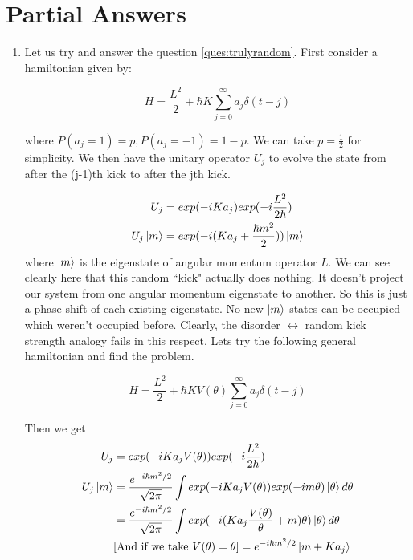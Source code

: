 \documentclass[12pt]{article}
\begin{document}
\section{Partial Answers}
\begin{enumerate}
    \item Let us try and answer the question \ref{ques:trulyrandom}.
    First consider a hamiltonian given by:

    \begin{equation}
        H = \frac{L^2}{2} + \hbar K \sum_{j=0}^{\infty} a_j \delta(t - j)
    \end{equation}

    where $P(a_j = 1) = p, P(a_j = -1) = 1 - p$. We can take $p = \frac{1}{2}$
    for simplicity. We then have the unitary operator $U_j$ to evolve the state
    from after the (j-1)th kick to after the jth kick.

    \begin{align}
        U_j &= exp(-iKa_j) exp(-i\frac{L^2}{2\hbar}) \\
        U_j \ket{m} &= exp(-i (Ka_j + \frac{\hbar m^2}{2})) \ket{m}
    \end{align}
    where $\ket{m}$ is the eigenstate of angular momentum operator $L$.
    We can see clearly here that this random ``kick" actually does nothing.
    It doesn't project our system from one angular momentum eigenstate to
    another. So this is just a phase shift of each existing eigenstate.
    No new $\ket{m}$ states can be occupied which weren't occupied before.
    Clearly, the disorder $\leftrightarrow$ random kick strength analogy
    fails in this respect. Lets try the following general hamiltonian
    and find the problem.

    \begin{equation}
        H = \frac{L^2}{2}
            + \hbar K V(\theta) \sum_{j=0}^{\infty} a_j \delta(t - j)
    \end{equation}

    Then we get
    \begin{align}
        U_j &= exp(-iKa_jV(\theta)) exp(-i\frac{L^2}{2\hbar}) \\
        U_j \ket{m} &= 	\frac{e^{-i \hbar m^2/2}}{\sqrt{2\pi}}
        \int exp(-iKa_jV(\theta)) exp(-im\theta) \ket{\theta} d\theta \\
        &= 	\frac{e^{-i \hbar m^2/2}}{\sqrt{2\pi}}
        \int exp(-i(Ka_j\frac{V(\theta)}{\theta} + m)\theta) \ket{\theta} d\theta \\
        &[\text{And if we take } V(\theta) = \theta] = e^{-i \hbar m^2/2} \ket{m + Ka_j}
    \end{align}


\end{enumerate}
\end{document}
